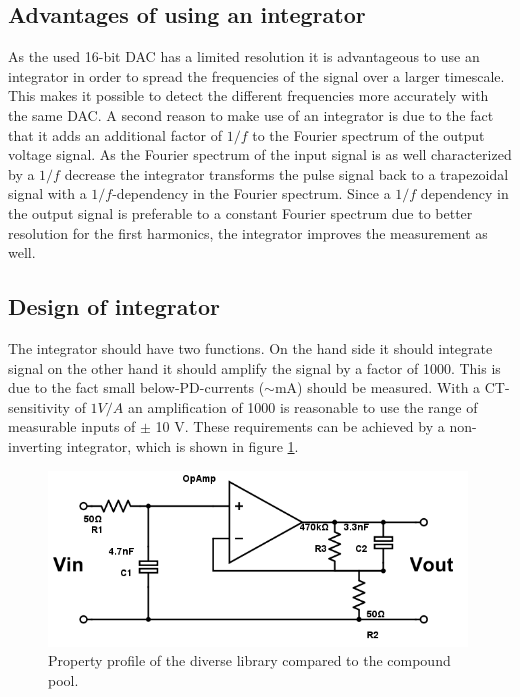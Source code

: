 \subsection{Advantages of using an integrator}
As the used 16-bit DAC has a limited resolution it is advantageous to use an integrator in order to spread the frequencies of the signal over a larger timescale. This makes it possible to detect the different frequencies more accurately with the same DAC. 
A second reason to make use of an integrator is due to the fact that it adds an additional factor of $1/f$ to the Fourier spectrum of the output voltage signal. As the Fourier spectrum of the input signal is as well characterized by a $1/f$ decrease the integrator transforms the pulse signal back to a trapezoidal signal with a $1/f$-dependency in the Fourier spectrum. Since a $1/f$ dependency in the output signal is preferable to a constant Fourier spectrum due to better resolution for the first harmonics, the integrator improves the measurement as well. 

\subsection{Design of integrator}
The integrator should have two functions. On the hand side it should integrate signal on the other hand it should amplify the signal by a factor of 1000. This is due to the fact small below-PD-currents ($\sim$mA) should be measured. With a CT-sensitivity of $1V/A$ an amplification of 1000 is reasonable to use the range of measurable inputs of $\pm$ 10 V. These requirements can be achieved by a non-inverting integrator, which is shown in figure  \ref{fig.circuit}. 

\begin{figure}[h!tb]
\includegraphics[width=0.99\textwidth]{figures/Method/integrator/circuit.png}
    \caption{Property profile of the diverse library compared to the compound pool.}
    \label{fig.circuit}
    \end{figure}	



